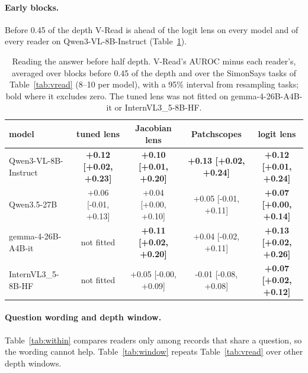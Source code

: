 \paragraph{Early blocks.} Before 0.45 of the depth V-Read is ahead of the logit lens on every model and of every reader on Qwen3-VL-8B-Instruct (Table~\ref{tab:early}).

\begin{table}[!htbp]
  \centering
\footnotesize \setlength{\tabcolsep}{4pt}
\caption{Reading the answer before half depth. V-Read's AUROC minus each reader's, averaged over blocks before 0.45 of the depth and over the SimonSays tasks of Table~\ref{tab:vread} (8--10 per model), with a 95\% interval from resampling tasks; bold where it excludes zero. The tuned lens was not fitted on gemma-4-26B-A4B-it or InternVL3\_5-8B-HF.}
  \label{tab:early}
\begin{tabular}{lcccc}
\toprule
model & tuned lens & Jacobian lens & Patchscopes & logit lens \\
\midrule
Qwen3-VL-8B-Instruct & \textbf{+0.12 [+0.02, +0.23]} & \textbf{+0.10 [+0.01, +0.20]} & \textbf{+0.13 [+0.02, +0.24]} & \textbf{+0.12 [+0.01, +0.24]} \\
Qwen3.5-27B & +0.06 [-0.01, +0.13] & +0.04 [+0.00, +0.10] & +0.05 [-0.01, +0.11] & \textbf{+0.07 [+0.00, +0.14]} \\
gemma-4-26B-A4B-it & not fitted & \textbf{+0.11 [+0.02, +0.20]} & +0.04 [-0.02, +0.11] & \textbf{+0.13 [+0.02, +0.26]} \\
InternVL3\_5-8B-HF & not fitted & +0.05 [-0.00, +0.09] & -0.01 [-0.08, +0.08] & \textbf{+0.07 [+0.02, +0.12]} \\
\bottomrule
\end{tabular}
\end{table}

\paragraph{Question wording and depth window.} Table~\ref{tab:within} compares readers only among records that share a question, so the wording cannot help. Table~\ref{tab:window} repeats Table~\ref{tab:vread} over other depth windows.

